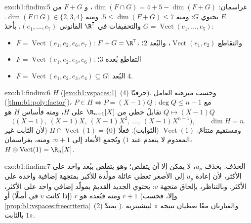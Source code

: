 \begin{solution}{exo:b1:findim:5}
غراسمان: $\dim(F \cap G) = 4 + 5 - \dim(F + G)$، و $F + G$
 من $E$ يحتوي $G$: ومنه $5 \leq \dim(F+G) \leq 7$. ومنه
$\dim(F \cap G) \in \{2, 3, 4\}$. والتحقيقات في $\R^7$ 
القانوني $(e_1, \dots, e_7)$، بأخذ $G =
\operatorname{Vect}(e_1, \dots, e_5)$:
\begin{itemize}
  \item $F = \operatorname{Vect}(e_1, e_2, e_6, e_7)$: $F + G = \R^7$،
        والتقاطع $\operatorname{Vect}(e_1, e_2)$، والبُعد $2$؛
  \item $F = \operatorname{Vect}(e_1, e_2, e_3, e_6)$: التقاطع
        بُعده $3$؛
  \item $F = \operatorname{Vect}(e_1, e_2, e_3, e_4) \subseteq G$:
        البُعد $4$.
\end{itemize}
\end{solution}

\begin{solution}{exo:b1:findim:6}
 $H$  (\cref{exo:b1:vspaces:1}~(4) حرفيًا). وحسب
مبرهنة العامل (\cref{thm:b1:poly:factor})، $P \in H \iff P =
(X-1)Q$ مع $\deg Q \leq n - 1$:  $Q \mapsto (X-1)Q$
تقابلٌ خطي من $\R_{n-1}[X]$ على $H$، ومنه فأساس $H$ هو
\[
\bigl((X-1),\ (X-1)X,\ (X-1)X^2,\ \dots,\ (X-1)X^{n-1}\bigr),
\qquad \dim H = n .
\]
ومستقيم متتامّ: $\operatorname{Vect}(1)$ (الثوابت). فعلًا
$H \cap \operatorname{Vect}(1) = \{0\}$ (لأن الثابت غير المعدوم لا
ينعدم عند $1$) وتُجمع الأبعاد إلى $n + 1$: ومنه، بغراسمان، $H
\oplus \operatorname{Vect}(1) = \R_n[X]$.
\end{solution}

\begin{solution}{exo:b1:findim:7}
الحذف: بحذف $u_p$، لا يمكن  إلا أن يتقلص؛ وهو يتقلص
ببُعد واحد على الأكثر، لأن إعادة $u_p$ إلى  
الأصغر تعطي عائلة مولِّدة للأكبر بمتجهة إضافية واحدة على
الأكثر. وبالتناظر، بإلحاق متجهة $v$: يحتوي 
الجديد القديمَ بمولّد إضافي واحد على الأكثر، ومنه فبُعده
هو $r$ (إذا كانت $v$ في  أصلًا) أو $r + 1$
(وإلا، فحسب \cref{prop:b1:vspaces:freecriteria}~(2) يمتدّ ).
والعبارتان معًا تعطيان نتيجة «
ليبشيتزية بالثابت $1$».
\end{solution}

